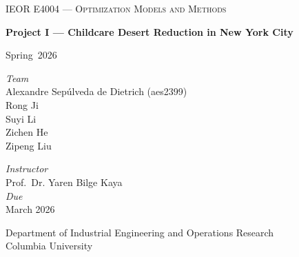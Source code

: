 \documentclass[11pt]{article}
\newcommand{\coursecode}{IEOR E4004}
\newcommand{\coursetitle}{Optimization Models and Methods}
\newcommand{\assignmenttitle}{Project I --- Childcare Desert Reduction in New York City}
\newcommand{\term}{Spring~2026}
\newcommand{\instructor}{Prof.\ Dr. Yaren Bilge Kaya}
\newcommand{\dueday}{March 2026}
\newif\ifshowtoc
\newif\ifshowai
\newcommand{\1}{\mathbb{I}}
\begin{document}

\begin{titlepage}
  \thispagestyle{coverstyle}
  \centering
  \vspace*{0.2cm}
  \vspace{0.5cm}
  {\Large \textsc{\coursecode{} — \coursetitle{}} \par}
  \vspace{0.2cm}
  {\LARGE \textbf{\assignmenttitle} \par}
  \vspace{0.3cm}
  {\large \term \par}
  \vspace{0.6cm}
  \noindent\makebox[\linewidth]{\rule{\linewidth}{1.2pt}}

    \vspace{0.9cm}
    \begin{minipage}{0.48\textwidth}
      \raggedright
      \textit{Team}\\
      Alexandre Sep\'ulveda de Dietrich (aes2399)\\
      Rong Ji\\
      Suyi Li\\
      Zichen He\\
      Zipeng Liu
    \end{minipage}\hfill
    \begin{minipage}{0.48\textwidth}
      \raggedleft
      \textit{Instructor}\\
      \instructor\\[4pt]
      \textit{Due}\\
      \dueday
    \end{minipage}

  \vfill
  {\large Department of Industrial Engineering and Operations Research\\Columbia University}
\end{titlepage}

\setcounter{page}{2}

\ifshowtoc
\tableofcontents
\newpage
\fi

\ifshowai
\section*{Academic integrity \& AI use}
AI tools were used only as a writing and formatting assistant. The modeling approach, data preparation, optimization logic, interpretation of results, and final submitted content were produced, reviewed, and validated by the project team. AI assistance was limited to presentation tasks such as \LaTeX{} polishing, wording refinement, and formatting.
\addcontentsline{toc}{section}{Academic integrity \& AI use}
\fi
\end{document}
